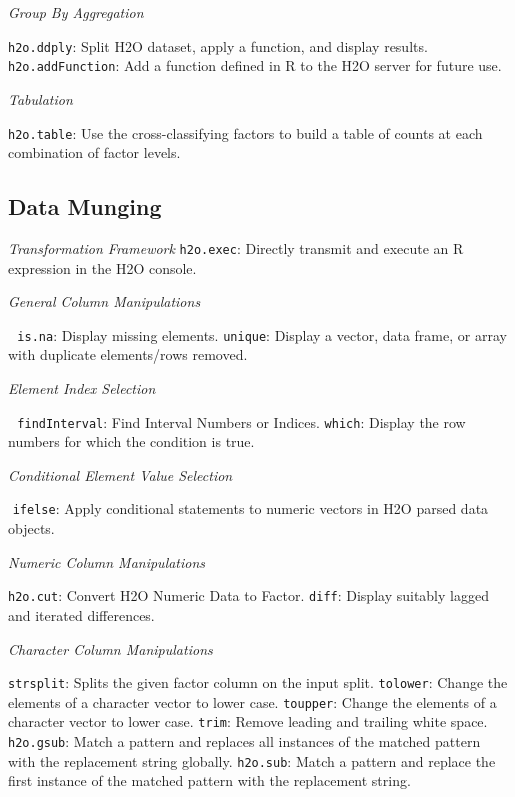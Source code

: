 \documentclass[11pt]{article}
\begin{document}
{{\emph{Group By Aggregation}\par
{\texttt{h2o.ddply}}: Split H2O dataset, apply a function, and display results.\newline
{\texttt{h2o.addFunction}}: Add a function defined in R to the H2O server for future use. \newline

\emph{Tabulation}\par
{\texttt{h2o.table}}: Use the cross-classifying factors to build a table of counts at each combination of factor levels.

\subsection{Data Munging}\par

\emph{Transformation Framework}\newline
{\texttt{h2o.exec}}: Directly transmit and execute an R expression in the H2O console.\newline

\emph{General Column Manipulations}\par 
{\texttt{is.na}}: Display missing elements.  \newline
{\texttt{unique}}: Display a vector, data frame, or array with duplicate elements/rows removed.\newline

\emph{Element Index Selection}\par 
{\texttt{findInterval}}: Find Interval Numbers or Indices.\newline
{\texttt{which}}: Display the row numbers for which the condition is true.\newline

\emph{Conditional Element Value Selection}\par {\texttt{ifelse}}: Apply conditional statements to numeric vectors in H2O parsed data objects.\newline

\emph{Numeric Column Manipulations}\par
{\texttt{h2o.cut}}: Convert H2O Numeric Data to Factor. \newline
{\texttt{diff}}: Display suitably lagged and iterated differences.\newline

\emph{Character Column Manipulations}\par
{\texttt{strsplit}}: Splits the given factor column on the input split. \newline
{\texttt{tolower}}: Change the elements of a character vector to lower case. \newline
{\texttt{toupper}}: Change the elements of a character vector to lower case. \newline
{\texttt{trim}}: Remove leading and trailing white space.\newline
{\texttt{h2o.gsub}}: Match a pattern and replaces all instances of the matched pattern with the replacement string globally. \newline
{\texttt{h2o.sub}}: Match a pattern and replace the first instance of the matched pattern with the replacement string.\newline

}}
\end{document}
